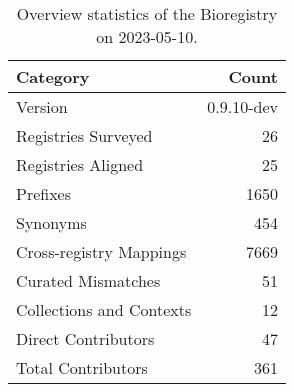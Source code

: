 \begin{table}
\caption{Overview statistics of the Bioregistry on 2023-05-10.}
\label{tab:bioregistry-summary}
\begin{tabular}{lr}
\toprule
Category & Count \\
\midrule
Version & 0.9.10-dev \\
Registries Surveyed & 26 \\
Registries Aligned & 25 \\
Prefixes & 1650 \\
Synonyms & 454 \\
Cross-registry Mappings & 7669 \\
Curated Mismatches & 51 \\
Collections and Contexts & 12 \\
Direct Contributors & 47 \\
Total Contributors & 361 \\
\bottomrule
\end{tabular}
\end{table}
